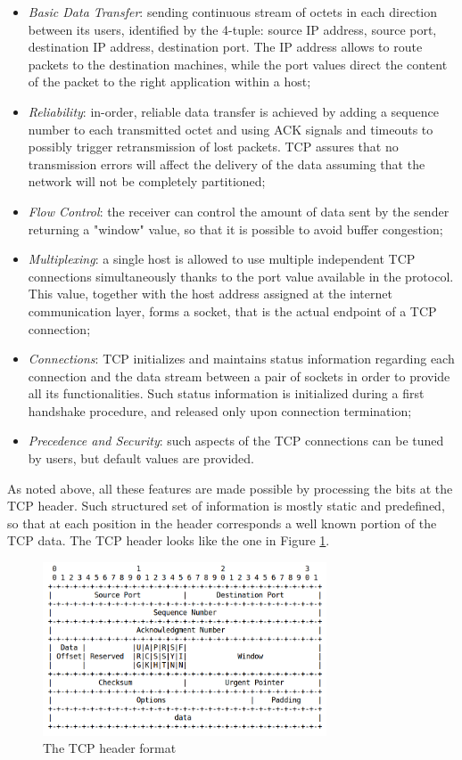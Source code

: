 \begin{itemize}
  \item \textit{Basic Data Transfer}: sending continuous stream of octets in each direction between its users, identified by the 4-tuple: source IP address, source port, destination IP address, destination port. The IP address allows to route packets to the destination machines, while the port values direct the content of the packet to the right application within a host;
  \item \textit{Reliability}: in-order, reliable data transfer is achieved by adding a sequence number to each transmitted octet and using ACK signals and timeouts to possibly trigger retransmission of lost packets. TCP assures that no transmission errors will affect the delivery of the data assuming that the network will not be completely partitioned;
  \item \textit{Flow Control}: the receiver can control the amount of data sent by the sender returning a "window" value, so that it is possible to avoid buffer congestion;
  \item \textit{Multiplexing}: a single host is allowed to use multiple independent TCP connections simultaneously thanks to the port value available in the protocol. This value, together with the host address assigned at the internet communication layer, forms a socket, that is the actual endpoint of a TCP connection;
  \item \textit{Connections}: TCP initializes and maintains status information regarding each connection and the data stream between a pair of sockets in order to provide all its functionalities. Such status information is initialized during a first handshake procedure, and released only upon connection termination;
  \item \textit{Precedence and Security}: such aspects of the TCP connections can be tuned by users, but default values are provided.
\end{itemize}

As noted above, all these features are made possible by processing the bits at the TCP header. Such structured set of information is mostly static and predefined, so that at each position in the header corresponds a well known portion of the TCP data. The TCP header looks like the one in Figure \ref{fig:tcp_header}.

\begin{figure}[!htb]
\centering
\includegraphics[width=0.75\textwidth]{images/tcp_header}
\caption{The TCP header format}
\label{fig:tcp_header}
\end{figure}

